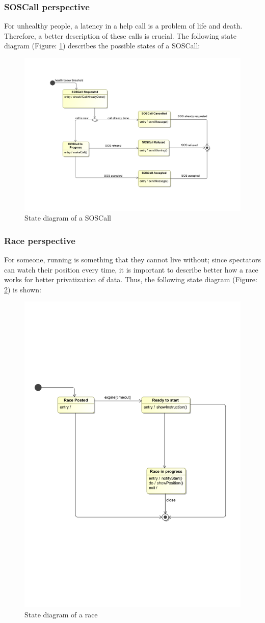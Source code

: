 \subsubsection{SOSCall perspective}
For unhealthy people, a latency in a help call is a problem of life and death. Therefore, a better 
description of these calls is crucial. The following state diagram (Figure: \ref{fig:sosdiagram}) 
describes the possible states of a SOSCall:

\begin{figure}[H]
\includegraphics[width=0.8\linewidth]{Images/sosdiagram}
\caption{State diagram of a SOSCall}
\label{fig:sosdiagram}
\end{figure}

\subsubsection{Race perspective}
For someone, running is something that they cannot live without; since spectators can watch their 
position every time, it is important to describe better how a race works for better privatization of 
data. Thus, the following state diagram (Figure: \ref{fig:racediagram}) is shown: 

\begin{figure}[H]
\includegraphics[width=0.8\linewidth]{Images/racediagram}
\caption{State diagram of a race}
\label{fig:racediagram}
\end{figure}